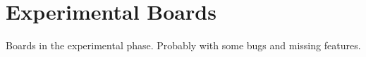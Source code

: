\chapter{Experimental Boards} \hypertarget{def:eboards}{}

Boards in the experimental phase. Probably with some bugs and missing features. 






